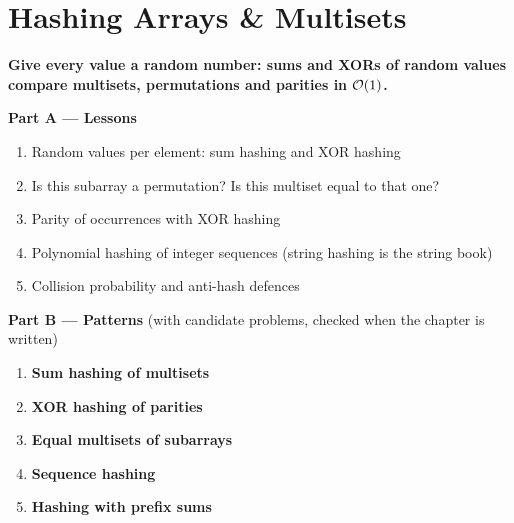 \chapter{Hashing Arrays \& Multisets}
\label{ch:array_hashing}

\begin{tcolorbox}[enhanced, colback=white, colframe=secondaryblue, boxrule=1pt, arc=2mm]
\textbf{\large\textcolor{primaryblue}{Give every value a random number: sums and XORs of random values compare multisets, permutations and parities in $\mathcal{O}(1)$.}}
\end{tcolorbox}


\begin{plannedbox}
\textbf{Part A --- Lessons}
\begin{enumerate}[leftmargin=*, label=\textbf{A\arabic*.}, itemsep=1pt]
    \item Random values per element: sum hashing and XOR hashing
    \item Is this subarray a permutation? Is this multiset equal to that one?
    \item Parity of occurrences with XOR hashing
    \item Polynomial hashing of integer sequences (string hashing is the string book)
    \item Collision probability and anti-hash defences
\end{enumerate}
\textbf{Part B --- Patterns} (with candidate problems, checked when the chapter is written)
\begin{enumerate}[leftmargin=*, label=\textbf{P\arabic*.}, itemsep=1pt]
    \item \textbf{Sum hashing of multisets}
    \item \textbf{XOR hashing of parities}
    \item \textbf{Equal multisets of subarrays}
    \item \textbf{Sequence hashing}
    \item \textbf{Hashing with prefix sums}
\end{enumerate}
\end{plannedbox}
